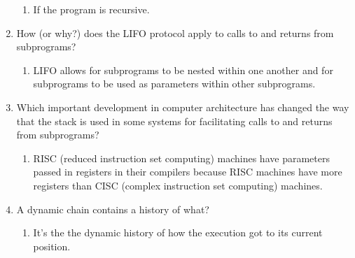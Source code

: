 \begin{enumerate}
\begin{answer}
    \begin{enumerate}
    \item If the program is recursive. 
    \end{enumerate}

    \end{answer}
  
  \item How (or why?) does the LIFO protocol apply to
    calls to and returns from subprograms?

  
    \begin{answer}

    \begin{enumerate}
    \item LIFO allows for subprograms to be nested within one another
 and for subprograms to be used as parameters within other subprograms.  
    \end{enumerate}

    \end{answer}

  \item Which important development in computer architecture
    has changed the way that the stack is used in some
    systems for facilitating calls to and returns from
    subprograms?

    \begin{answer}

    \begin{enumerate}
    \item RISC (reduced instruction set computing) machines have
      parameters passed in registers in their compilers because RISC
      machines have more registers than CISC (complex instruction set
      computing) machines.
 
    \end{enumerate}

    \end{answer}
  
  \item A dynamic chain contains a history of what?

  
    \begin{answer}

    \begin{enumerate}
    \item It's the the dynamic history of how the execution got to its
      current position.
 
    \end{enumerate}

    \end{answer}


\end{enumerate}
